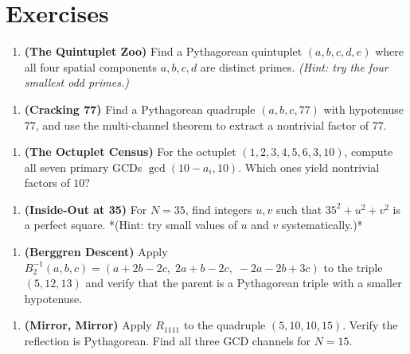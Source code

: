 \ornbreak



\section{Exercises}


\begin{enumerate}[leftmargin=*]
\item \textbf{(The Quintuplet Zoo)} Find a Pythagorean quintuplet $(a, b, c, d, e)$ where all four spatial components $a, b, c, d$ are distinct primes. \textit{(Hint: try the four smallest odd primes.)}
\end{enumerate}

\begin{enumerate}[leftmargin=*]
\item \textbf{(Cracking 77)} Find a Pythagorean quadruple $(a, b, c, 77)$ with hypotenuse $77$, and use the multi-channel theorem to extract a nontrivial factor of $77$.
\end{enumerate}

\begin{enumerate}[leftmargin=*]
\item \textbf{(The Octuplet Census)} For the octuplet $(1, 2, 3, 4, 5, 6, 3, 10)$, compute all seven primary GCDs $\gcd(10 - a_i, 10)$. Which ones yield nontrivial factors of $10$?
\end{enumerate}

\begin{enumerate}[leftmargin=*]
\item \textbf{(Inside-Out at 35)} For $N = 35$, find integers $u, v$ such that $35^2 + u^2 + v^2$ is a perfect square. *(Hint: try small values of $u$ and $v$ systematically.)*
\end{enumerate}

\begin{enumerate}[leftmargin=*]
\item \textbf{(Berggren Descent)} Apply $B_2^{-1}(a, b, c) = (a + 2b - 2c,\; 2a + b - 2c,\; -2a - 2b + 3c)$ to the triple $(5, 12, 13)$ and verify that the parent is a Pythagorean triple with a smaller hypotenuse.
\end{enumerate}

\begin{enumerate}[leftmargin=*]
\item \textbf{(Mirror, Mirror)} Apply $R_{1111}$ to the quadruple $(5, 10, 10, 15)$. Verify the reflection is Pythagorean. Find all three GCD channels for $N = 15$.
\end{enumerate}

